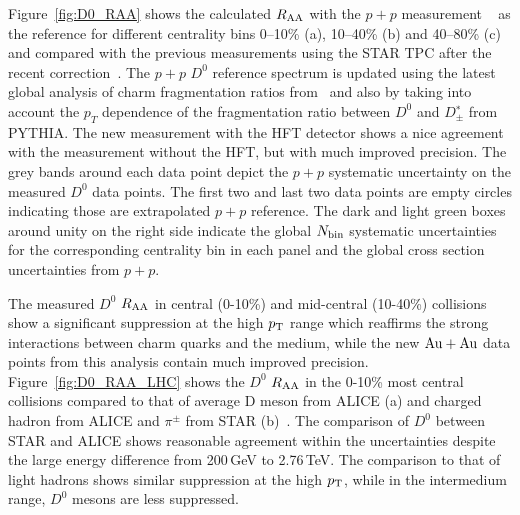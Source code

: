 \documentclass[%
 reprint,	
 amsmath,amssymb,
 aps,
 prc,
]{revtex4-1}
\begin{document}
Figure~\ref{fig:D0_RAA} shows the calculated $R_{\rm AA}$ with the $p + p$ measurement ~\cite{Star_D_pp} as the reference for different centrality bins 0--10\% (a), 10--40\% (b) and 40--80\% (c) and compared with the previous measurements using the STAR TPC after the recent correction~\cite{Star_D_RAA_corr}. The $p + p$ $D^0$ reference spectrum is updated using the latest global analysis of charm fragmentation ratios from~\cite{charm_frag} and also by taking into account the $p_T$ dependence of the fragmentation ratio between $D^0$ and $D^∗_\pm$ from PYTHIA. The new measurement with the HFT detector shows a nice agreement with the measurement without the HFT, but with much improved precision. The grey bands around each data point depict the $p + p$ systematic uncertainty on the measured $D^0$ data points. The first two and last two data points are empty circles indicating those are extrapolated $p + p$ reference. The dark and light green boxes around unity on the right side indicate the global $N_{\rm bin}$ systematic uncertainties for the corresponding centrality bin in each panel and the global cross section uncertainties from $p + p$.

The measured $D^0$ $R_{\rm AA}$ in central (0-10\%) and mid-central (10-40\%) collisions show a significant suppression at the high $p_{\rm T}$ range which reaffirms the strong interactions between charm quarks and the medium, while the new ${\rm{Au + Au}}$ data points from this analysis contain much improved precision. Figure~\ref{fig:D0_RAA_LHC} shows the $D^0$ $R_{\rm AA}$ in the 0-10\% most central collisions compared to that of average D meson from ALICE (a) and charged hadron from ALICE and $\pi^{\pm}$ from STAR (b)~\cite{Alice_D_RAA_2,Alice_hadron_RAA,PhenixPi0}. The comparison of $D^0$ between STAR and ALICE shows reasonable agreement within the uncertainties despite the large energy difference from 200\,GeV to 2.76\,TeV. The comparison to that of light hadrons shows similar suppression at the high $p_{\rm T}$, while in the intermedium range, $D^0$ mesons are less suppressed.



\end{document}
